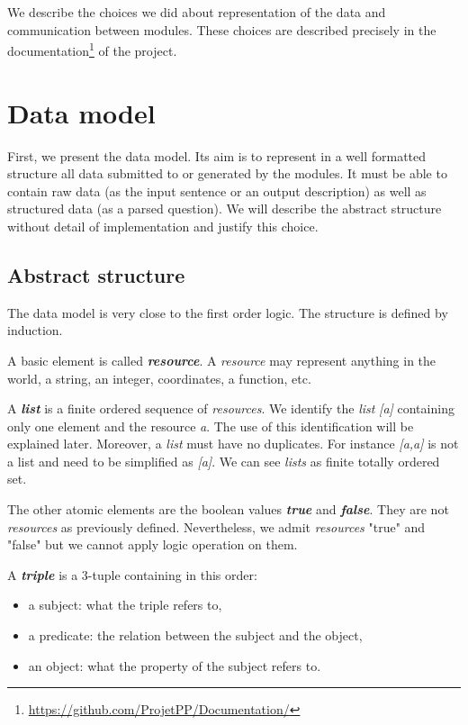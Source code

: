 We describe the choices we did about representation of the data and communication between modules.
These choices are described precisely in the documentation\footnote{\url{https://github.com/ProjetPP/Documentation/}} of the project.

\section{Data model}
\label{rdf}

First, we present the data model. Its aim is to represent in a well formatted structure all data submitted to or generated by the modules. It must be able to contain raw data (as the input sentence or an output description) as well as structured data (as a parsed question). We will describe the abstract structure without detail of implementation and justify this choice.

\subsection{Abstract structure}

The data model is very close to the first order logic. The structure is defined by induction.

A basic element is called \textsl{\bf resource}. A \textsl{resource} may represent anything in the world, a string, an integer, coordinates, a function, etc.

A \textsl{\bf list} is a finite ordered sequence of \textsl{resources}. We identify the \textsl{list} \textsl{[a]} containing only one element and the resource \textsl{a}. The use of this identification will be explained later. Moreover, a \textsl{list} must have no duplicates. For instance \textsl{[a,a]} is not a list and need to be simplified as \textsl{[a]}. We can see \textsl{lists} as finite totally ordered set.

The other atomic elements are the boolean values \textsl{\bf true} and \textsl{\bf false}. They are not \textsl{resources} as previously defined. Nevertheless, we admit \textsl{resources} "true" and "false" but we cannot apply logic operation on them.

A \textsl{\bf triple} is a 3-tuple containing in this order:
\begin{itemize}
    \item a subject: what the triple refers to,
    \item a predicate: the relation between the subject and the object,
    \item an object: what the property of the subject refers to.
\end{itemize}

